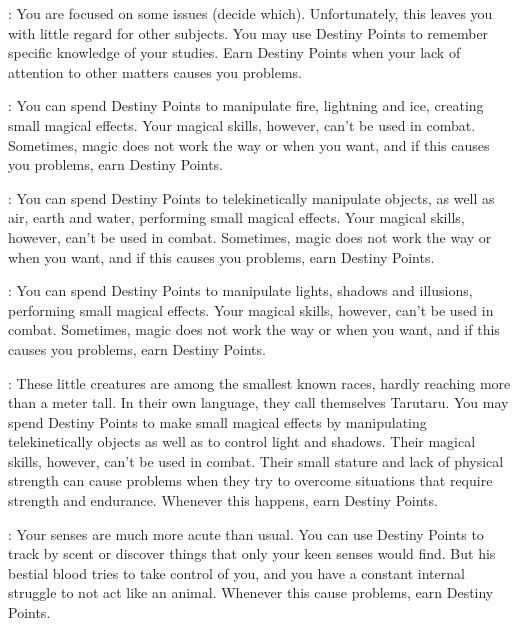 \begin{multicols}{2}
\begin{ffcolpage}
\end{ffcolpage} \pw \begin{ffcolpage}
: You are focused on some issues (decide which). Unfortunately, this leaves you with little regard for other subjects. You may use Destiny Points to remember specific knowledge of your studies. Earn Destiny Points when your lack of attention to other matters causes you problems.
\end{ffcolpage} \pw \begin{ffcolpage}
: You can spend Destiny Points to manipulate fire, lightning and ice, creating small magical effects. Your magical skills, however, can’t be used in combat. Sometimes, magic does not work the way or when you want, and if this causes you problems, earn Destiny Points.
\end{ffcolpage} \pw \begin{ffcolpage}
: You can spend Destiny Points to telekinetically manipulate objects, as well as air, earth and water, performing small magical effects. Your magical skills, however, can’t be used in combat. Sometimes, magic does not work the way or when you want, and if this causes you problems, earn Destiny Points.
\end{ffcolpage} \pw \begin{ffcolpage}
: You can spend Destiny Points to manipulate lights, shadows and illusions, performing small magical effects. Your magical skills, however, can’t be used in combat. Sometimes, magic does not work the way or when you want, and if this causes you problems, earn Destiny Points.
\end{ffcolpage} \pw \begin{minipage}{.35\textwidth-2\columnsep}
: These little creatures are among the smallest known races, hardly reaching more than a meter tall. In their own language, they call themselves Tarutaru. You may spend Destiny Points to make small magical effects by manipulating telekinetically objects as well as to control light and shadows. Their magical skills, however, can’t be used in combat. Their small stature and lack of physical strength can cause problems when they try to overcome situations that require strength and endurance. Whenever this happens, earn Destiny Points.
\end{minipage} \pw \begin{ffcolpage}
: Your senses are much more acute than usual. You can use Destiny Points to track by scent or discover things that only your keen senses would find. But his bestial blood tries to take control of you, and you have a constant internal struggle to not act like an animal. Whenever this cause problems, earn Destiny Points.

\end{ffcolpage}
\end{multicols}
